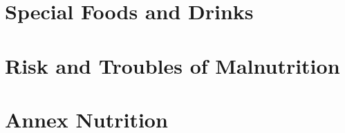 \documentclass[../main.tex]{subfiles}
\begin{document}


\chapter{Special Foods and Drinks}



\chapter{Risk and Troubles of Malnutrition}




\chapter{Annex Nutrition}








\label{FoodSoy}
\end{document}
